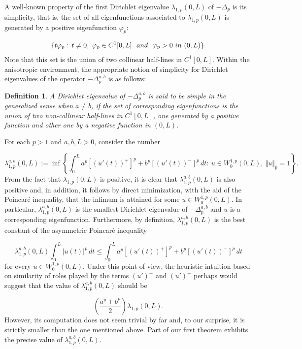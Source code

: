 \documentclass[a4paper,11pt]{article}
\newtheorem{defi}{Definition}[section]
\begin{document}
{A well-known property of the first Dirichlet eigenvalue $\lambda_{1,p}(0,L)$ of $- \Delta_p$ is its simplicity, that is, the set of all eigenfunctions associated to $\lambda_{1,p}(0,L)$ is generated by a positive eigenfunction $\varphi_p$:

\[
\{t \varphi_p:\, t \neq 0,\ \varphi_p \in C^1[0,L] \ \ {\rm and}\ \ \varphi_p > 0\ {\rm in}\ (0, L) \}.
\]
Note that this set is the union of two collinear half-lines in $C^1[0,L]$. Within the anisotropic environment, the appropriate notion of simplicity for Dirichlet eigenvalues of the operator $-\Delta^{a,b}_p$ is as follows:

\begin{defi} \label{simple}
A Dirichlet eigenvalue of $-\Delta^{a,b}_p$ is said to be simple in the generalized sense when $a \neq b$, if the set of corresponding eigenfunctions is the union of two non-collinear half-lines in $C^1[0,L]$, one generated by a positive function and other one by a negative function in $(0,L)$.
\end{defi}

For each $p > 1$ and $a, b, L > 0$, consider the number

\[
\lambda^{a,b}_{1,p}(0,L):= \inf \left\{ \int_0^L a^{p}[(u'(t))^{+}]^{p} + b^{p}[(u'(t))^{-}]^{p}\, dt:\ u \in W_0^{1,p}(0,L),\ \Vert u \Vert_p = 1 \right\}.
\]
From the fact that $\lambda_{1,p}(0,L)$ is positive, it is clear that $\lambda^{a,b}_{1,p}(0,L)$ is also positive and, in addition, it follows by direct minimization, with the aid of the Poincaré inequality, that the infimum is attained for some $u \in W_0^{1,p}(0,L)$. In particular, $\lambda^{a,b}_{1,p}(0,L)$ is the smallest Dirichlet eigenvalue of $-\Delta^{a,b}_p$ and $u$ is a corresponding eigenfunction. Furthermore, by definition, $\lambda^{a,b}_{1,p}(0,L)$ is the best constant of the asymmetric Poincaré inequality

\[
\lambda^{a,b}_{1,p}(0,L) \int_0^L \vert u(t) \vert^p\, dt \leq \int_0^L a^{p}[(u'(t))^{+}]^{p} + b^{p}[(u'(t))^{-}]^{p}\, dt
\]
for every $u \in W_0^{1,p}(0,L)$. Under this point of view, the heuristic intuition based on similarity of roles played by the terms $(u')^{+}$ and $(u')^{+}$ perhaps would suggest that the value of $\lambda^{a,b}_{1,p}(0,L)$ should be

\[
\displaystyle \left( \frac{a^p + b^p}{2}\right) \lambda_{1,p}(0,L).
\]
However, its computation does not seem trivial by far and, to our surprise, it is strictly smaller than the one mentioned above. Part of our first theorem exhibits the precise value of $\lambda^{a,b}_{1,p}(0,L)$.

}
\end{document}
